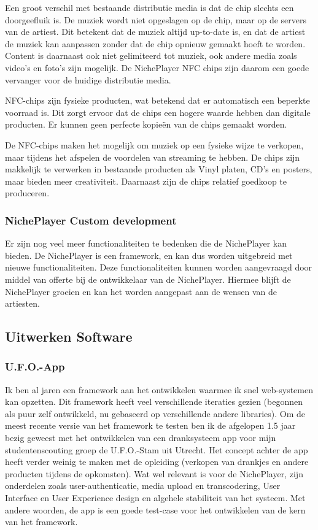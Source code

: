 Een groot verschil met bestaande distributie media is dat de chip slechts een doorgeefluik is. De muziek wordt niet opgeslagen op de chip, maar op de servers van de artiest. Dit betekent dat de muziek altijd up-to-date is, en dat de artiest de muziek kan aanpassen zonder dat de chip opnieuw gemaakt hoeft te worden. Content is daarnaast ook niet gelimiteerd tot muziek, ook andere media zoals video's en foto's zijn mogelijk. De NichePlayer NFC chips zijn daarom een goede vervanger voor de huidige distributie media.

NFC-chips zijn fysieke producten, wat betekend dat er automatisch een beperkte voorraad is. Dit zorgt ervoor dat de chips een hogere waarde hebben dan digitale producten. Er kunnen geen perfecte kopieën van de chips gemaakt worden.

De NFC-chips maken het mogelijk om muziek op een fysieke wijze te verkopen, maar tijdens het afspelen de voordelen van streaming te hebben. De chips zijn makkelijk te verwerken in bestaande producten als Vinyl platen, CD's en posters, maar bieden meer creativiteit. Daarnaast zijn de chips relatief goedkoop te produceren.

\subsubsection*{NichePlayer Custom development}
Er zijn nog veel meer functionaliteiten te bedenken die de NichePlayer kan bieden. De NichePlayer is een framework, en kan dus worden uitgebreid met nieuwe functionaliteiten. Deze functionaliteiten kunnen worden aangevraagd door middel van offerte bij de ontwikkelaar van de NichePlayer. Hiermee blijft de NichePlayer groeien en kan het worden aangepast aan de wensen van de artiesten.

\subsection {Uitwerken Software}
\subsubsection*{U.F.O.-App}
Ik ben al jaren een framework aan het ontwikkelen waarmee ik snel web-systemen kan opzetten. Dit framework heeft veel verschillende iteraties gezien (begonnen als puur zelf ontwikkeld, nu gebaseerd op verschillende andere libraries). Om de meest recente versie van het framework te testen ben ik de afgelopen 1.5 jaar bezig geweest met het ontwikkelen van een dranksysteem app voor mijn studentenscouting groep de U.F.O.-Stam uit Utrecht. Het concept achter de app heeft verder weinig te maken met de opleiding (verkopen van drankjes en andere producten tijdens de opkomsten). Wat wel relevant is voor de NichePlayer, zijn onderdelen zoals user-authenticatie, media upload en transcodering, User Interface en User Experience design en algehele stabiliteit van het systeem. Met andere woorden, de app is een goede test-case voor het ontwikkelen van de kern van het framework.

